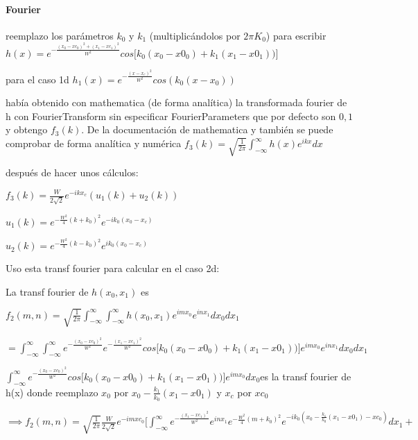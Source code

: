 \documentclass{article}
\begin{document}
\paragraph{Fourier}

\begin{description}
\item reemplazo los parámetros $k_0$ y $k_1$ (multiplicándolos por $2 \pi K_0$) para escribir $ h(x) = e^{- \frac{(x_0-xc_0)^2 + (x_1 - xc_1)^2 }{W^2}} cos\big[k_0(x_0 - x0_0) +  k_1(x_1 - x0_1)) \big]  $
\item para el caso 1d $h_1(x) = e^{-\frac{(x-x_c)^2}{W^2} } cos(k_0(x-x_0)) $ 

\item había obtenido con mathematica (de forma analítica) la transformada fourier de h con FourierTransform sin especificar FourierParameters que por defecto son  $0, 1$  y obtengo $f_3(k)$. De la documentación de mathematica y también se puede comprobar de forma analítica y numérica $f_3(k) = \sqrt{\frac{1}{2 \pi}} \int_{- \infty}^{\infty}{h(x) e^{i k x} dx} $ 
\item después de hacer unos cálculos:
\item $f_3(k) = \frac{W}{2 \sqrt{2}}  e^{-i  k  x_c}  (u_1(k) + u_2(k)) $
\item $u_1(k) = e^{-\frac{W^2}{4}  (k+k_0)^2} e^{-i  k_0 (x_0-x_c)} $ 
\item $u_2(k) = e^{-\frac{W^2}{4}  (k-k_0)^2} e^{i  k_0 (x_0-x_c)} $ 
\item Uso esta  transf fourier para calcular en el caso 2d:
\item La transf fourier de $h(x_0, x_1)$ es 
\item $f_2(m,n) = \sqrt{\frac{1}{2 \pi}} \int_{- \infty}^{\infty}\int_{- \infty}^{\infty}{h(x_0,x_1) e^{i m x_0} e^{i n x_1} dx_0 dx_1 } $
\item $ =  \int_{- \infty}^{\infty}\int_{- \infty}^{\infty} {e^{- \frac{(x_0-xc_0)^2}{W^2}} 
e^{- \frac{(x_1-xc_1)^2}{W^2}}  cos\big[k_0(x_0 - x0_0) +  k_1(x_1 - x0_1)) \big] e^{i m x_0} e^{i n x_1} 
dx_0 dx_1}$ 

\item $\int_{- \infty}^{\infty} {e^{- \frac{(x_0-xc_0)^2}{W^2}}  cos\big[k_0(x_0 - x0_0) +  k_1(x_1 - x0_1)) \big]e^{i m x_0}  dx_0} $es la transf fourier de h(x) donde reemplazo $x_0$ por $x_0 - \frac{k_1}{k_0}(x_1 - x0_1)$  y $x_c$ por $xc_0$
\item $\implies f_2(m,n) =  \sqrt{\frac{1}{2 \pi}} \frac{W}{2 \sqrt{2}}  e^{-i  m  xc_0} \big[ \int_{- \infty}^{\infty}{e^{- \frac{(x_1-xc_1)^2}{W^2}} 
e^{i n x_1} e^{-\frac{W^2}{4}  (m+k_0)^2} e^{-i  k_0 ( x_0 - \frac{k_1}{k_0}(x_1 - x0_1) -xc_0)} dx_1}  + $ 


\end{description}
\end{document}
